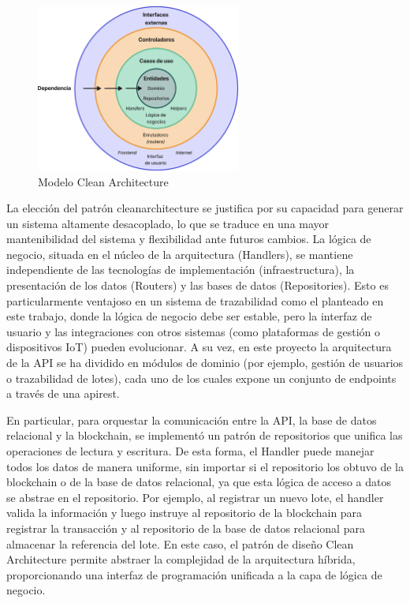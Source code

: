 \begin{figure}[!b]
\centering
\includegraphics[width=0.6\textwidth]{Figures/clean-architecture.png}
\caption{Modelo Clean Architecture}
\label{fig:clean-architecture}
\end{figure}

La elección del patrón \gls{cleanarchitecture} se justifica por su capacidad para generar un sistema altamente desacoplado, lo que se traduce en una mayor mantenibilidad del sistema y flexibilidad ante futuros cambios. La lógica de negocio, situada en el núcleo de la arquitectura (Handlers), se mantiene independiente de las tecnologías de implementación (infraestructura), la presentación de los datos (Routers) y las bases de datos (Repositories). Esto es particularmente ventajoso en un sistema de trazabilidad como el planteado en este trabajo, donde la lógica de negocio debe ser estable, pero la interfaz de usuario y las integraciones con otros sistemas (como plataformas de gestión o dispositivos IoT) pueden evolucionar. A su vez, en este proyecto la arquitectura de la API se ha dividido en módulos de dominio (por ejemplo, gestión de usuarios o trazabilidad de lotes), cada uno de los cuales expone un conjunto de \glspl{endpoint} a través de una \gls{apirest}.

En particular, para orquestar la comunicación entre la API, la base de datos relacional y la blockchain, se implementó un patrón de repositorios que unifica las operaciones de lectura y escritura. De esta forma, el Handler puede manejar todos los datos de manera uniforme, sin importar si el repositorio los obtuvo de la blockchain o de la base de datos relacional, ya que esta lógica de acceso a datos se abstrae en el repositorio. Por ejemplo, al registrar un nuevo lote, el handler valida la información y luego instruye al repositorio de la blockchain para registrar la transacción y al repositorio de la base de datos relacional para almacenar la referencia del lote. En este caso, el patrón de diseño Clean Architecture permite abstraer la complejidad de la arquitectura híbrida, proporcionando una interfaz de programación unificada a la capa de lógica de negocio.

